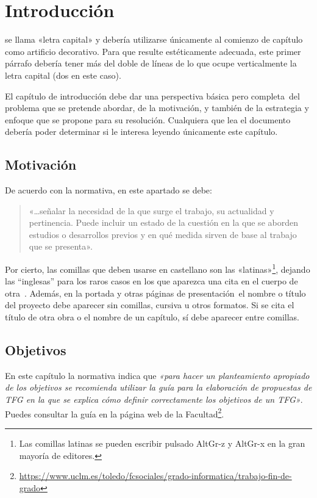 \chapter{Introducción}

 se llama «letra capital» y debería utilizarse únicamente al comienzo de capítulo como artificio decorativo. Para que resulte estéticamente adecuada, este primer párrafo debería tener más del doble de líneas de lo que ocupe verticalmente la letra capital (dos en este caso).

El capítulo de introducción debe dar una perspectiva básica \textemdash pero completa\textemdash~del problema que se pretende abordar, de la motivación, y también de la estrategia y enfoque que se propone para su resolución. Cualquiera que lea el documento debería poder determinar si le interesa leyendo únicamente este capítulo.

\section{Motivación}

De acuerdo con la normativa, en este apartado se debe:

\begin{quote}
  «\dots señalar la necesidad de la que surge el trabajo, su actualidad y pertinencia. Puede incluir un estado de la cuestión en la que se aborden estudios o desarrollos previos y en qué medida sirven de base al trabajo que se presenta».
\end{quote}

Por cierto, las comillas que deben usarse en castellano son las «latinas»\footnote{Las comillas latinas se pueden escribir pulsado AltGr-z y AltGr-x en la gran mayoría de editores.}, dejando las ``inglesas'' para los raros casos en los que aparezca una cita en el cuerpo de otra~\cite{sousa}. Además, en la portada \textemdash y otras páginas de presentación\textemdash~el nombre o título del proyecto debe aparecer sin comillas, cursiva u otros formatos. Si se cita el título de otra obra o el nombre de un capítulo, sí debe aparecer entre comillas.

\section{Objetivos}

En este capítulo la normativa indica que \emph{«para hacer un planteamiento apropiado de los objetivos se recomienda utilizar la guía para la elaboración de propuestas de \acf{TFG} en la que se explica cómo definir correctamente los objetivos de un \ac{TFG}»}. Puedes consultar la guía en la página web de la Facultad\footnote{\url{https://www.uclm.es/toledo/fcsociales/grado-informatica/trabajo-fin-de-grado}}.


